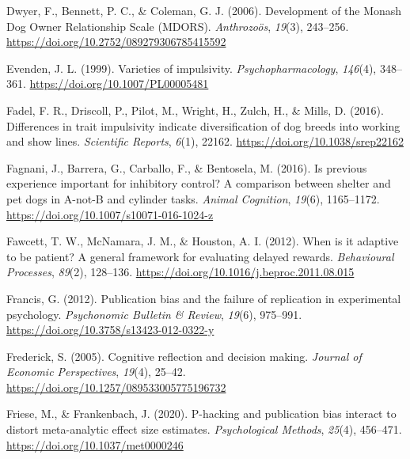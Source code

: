 \documentclass[
  pub,floatsintext]{apa6}
\newlength{\cslhangindent}
\newlength{\cslentryspacingunit} %
\newenvironment{CSLReferences}[2] %
 {%
  \setlength{\parindent}{0pt}
  \ifodd #1
  \let\oldpar\par
  \def\par{\hangindent=\cslhangindent\oldpar}
  \fi
  \setlength{\parskip}{#2\cslentryspacingunit}
 }%
 {}
\begin{document}
\begin{CSLReferences}{1}{0}
\leavevmode{}%
Dwyer, F., Bennett, P. C., \& Coleman, G. J. (2006). Development of the {Monash Dog Owner Relationship Scale} ({MDORS}). \emph{Anthrozoös}, \emph{19}(3), 243--256. \url{https://doi.org/10.2752/089279306785415592}

\leavevmode{}%
Evenden, J. L. (1999). Varieties of impulsivity. \emph{Psychopharmacology}, \emph{146}(4), 348--361. \url{https://doi.org/10.1007/PL00005481}

\leavevmode{}%
Fadel, F. R., Driscoll, P., Pilot, M., Wright, H., Zulch, H., \& Mills, D. (2016). Differences in trait impulsivity indicate diversification of dog breeds into working and show lines. \emph{Scientific Reports}, \emph{6}(1), 22162. \url{https://doi.org/10.1038/srep22162}

\leavevmode{}%
Fagnani, J., Barrera, G., Carballo, F., \& Bentosela, M. (2016). Is previous experience important for inhibitory control? {A} comparison between shelter and pet dogs in {A-not-B} and cylinder tasks. \emph{Animal Cognition}, \emph{19}(6), 1165--1172. \url{https://doi.org/10.1007/s10071-016-1024-z}

\leavevmode{}%
Fawcett, T. W., McNamara, J. M., \& Houston, A. I. (2012). When is it adaptive to be patient? {A} general framework for evaluating delayed rewards. \emph{Behavioural Processes}, \emph{89}(2), 128--136. \url{https://doi.org/10.1016/j.beproc.2011.08.015}

\leavevmode{}%
Francis, G. (2012). Publication bias and the failure of replication in experimental psychology. \emph{Psychonomic Bulletin \& Review}, \emph{19}(6), 975--991. \url{https://doi.org/10.3758/s13423-012-0322-y}

\leavevmode{}%
Frederick, S. (2005). Cognitive reflection and decision making. \emph{Journal of Economic Perspectives}, \emph{19}(4), 25--42. \url{https://doi.org/10.1257/089533005775196732}

\leavevmode{}%
Friese, M., \& Frankenbach, J. (2020). P-hacking and publication bias interact to distort meta-analytic effect size estimates. \emph{Psychological Methods}, \emph{25}(4), 456--471. \url{https://doi.org/10.1037/met0000246}


\end{CSLReferences}
\end{document}
